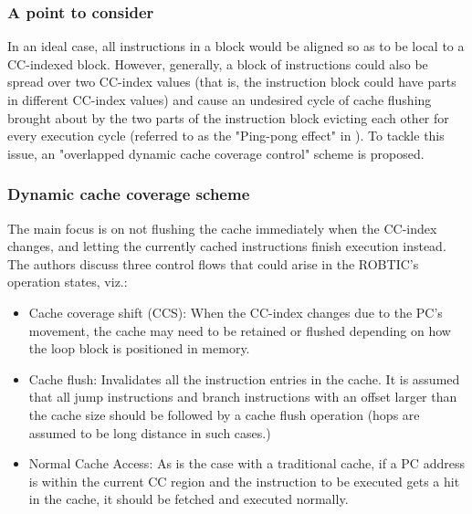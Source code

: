 \documentclass[conference]{IEEEtran}
\begin{document}
\subsubsection{A point to consider} In an ideal case, all instructions in a block would be aligned so as to be local to a CC-indexed block.
However, generally, a block of instructions could also be spread over two CC-index values (that is, the instruction block could have parts in different CC-index values) and cause an undesired cycle of cache flushing brought about by the two parts of the instruction block evicting each other for every execution cycle (referred to as the "Ping-pong effect" in \cite{robtic}). To tackle this issue, an "overlapped dynamic cache coverage control" scheme is proposed.

\subsubsection{Dynamic cache coverage scheme}
The main focus is on not flushing the cache immediately when the CC-index changes, and letting the currently cached instructions finish execution instead. The authors discuss three control flows that could arise in the ROBTIC's operation states, viz.:
\begin{itemize}
	\item Cache coverage shift (CCS): When the CC-index changes due to the PC's movement, the cache may need to be retained or flushed depending on how the loop block is positioned in memory.
	\item Cache flush: Invalidates all the instruction entries in the cache. It is assumed that all jump instructions and branch instructions with an offset larger than the cache size should be followed by a cache flush operation (hops are assumed to be long distance in such cases.)
	\item Normal Cache Access: As is the case with a traditional cache, if a PC address is within the current CC region and the instruction to be executed gets a hit in the cache, it should be fetched and executed normally.
\end{itemize}
\end{document}
